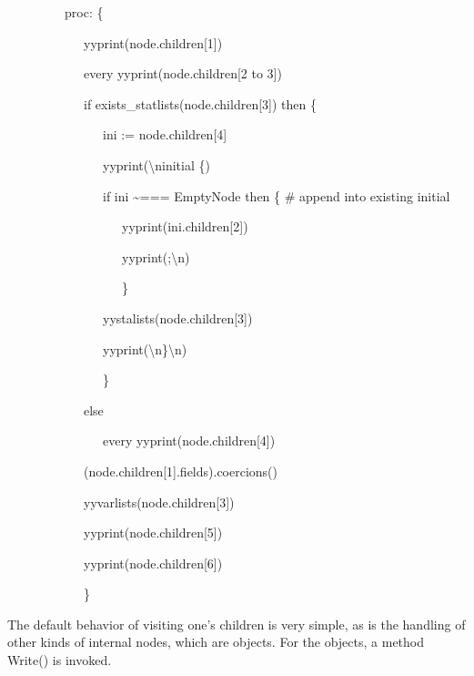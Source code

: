 {\ttfamily\mdseries
\ \ \ \ \ \ \ \ \ {\textquotedbl}proc{\textquotedbl}: \{}

{\ttfamily\mdseries
\ \ \ \ \ \ \ \ \ \ \ \ yyprint(node.children[1])}

{\ttfamily\mdseries
\ \ \ \ \ \ \ \ \ \ \ \ every yyprint(node.children[2 to 3])}

{\ttfamily\mdseries
\ \ \ \ \ \ \ \ \ \ \ \ if exists\_statlists(node.children[3]) then \{}

{\ttfamily\mdseries
\ \ \ \ \ \ \ \ \ \ \ \ \ \ \ ini := node.children[4]}

{\ttfamily\mdseries
\ \ \ \ \ \ \ \ \ \ \ \ \ \ \ yyprint({\textquotedbl}{\textbackslash}ninitial \{{\textquotedbl})}

{\ttfamily\mdseries
\ \ \ \ \ \ \ \ \ \ \ \ \ \ \ if ini \~{}=== EmptyNode then \{ \# append into existing initial}

{\ttfamily\mdseries
\ \ \ \ \ \ \ \ \ \ \ \ \ \ \ \ \ \ yyprint(ini.children[2])}

{\ttfamily\mdseries
\ \ \ \ \ \ \ \ \ \ \ \ \ \ \ \ \ \ yyprint({\textquotedbl};{\textbackslash}n{\textquotedbl})}

{\ttfamily\mdseries
\ \ \ \ \ \ \ \ \ \ \ \ \ \ \ \ \ \ \}}

{\ttfamily\mdseries
\ \ \ \ \ \ \ \ \ \ \ \ \ \ \ yystalists(node.children[3])}

{\ttfamily\mdseries
\ \ \ \ \ \ \ \ \ \ \ \ \ \ \ yyprint({\textquotedbl}{\textbackslash}n\}{\textbackslash}n{\textquotedbl})}

{\ttfamily\mdseries
\ \ \ \ \ \ \ \ \ \ \ \ \ \ \ \}}

{\ttfamily\mdseries
\ \ \ \ \ \ \ \ \ \ \ \ else}

{\ttfamily\mdseries
\ \ \ \ \ \ \ \ \ \ \ \ \ \ \ every yyprint(node.children[4])}

{\ttfamily\mdseries
\ \ \ \ \ \ \ \ \ \ \ \ (node.children[1].fields).coercions()}

{\ttfamily\mdseries
\ \ \ \ \ \ \ \ \ \ \ \ yyvarlists(node.children[3])}

{\ttfamily\mdseries
\ \ \ \ \ \ \ \ \ \ \ \ yyprint(node.children[5])}

{\ttfamily\mdseries
\ \ \ \ \ \ \ \ \ \ \ \ yyprint(node.children[6])}

{\ttfamily\mdseries
\ \ \ \ \ \ \ \ \ \ \ \ \}}

The default behavior of visiting one's children is very simple, as is
the handling of other kinds of internal nodes, which are objects. For
the objects, a method Write() is invoked.

